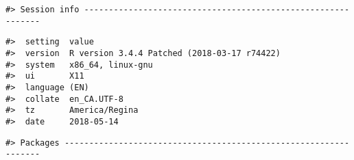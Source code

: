 \documentclass[12pt,]{article}
\begin{document}
\begin{verbatim}
#> Session info -------------------------------------------------------------
\end{verbatim}

\begin{verbatim}
#>  setting  value                                      
#>  version  R version 3.4.4 Patched (2018-03-17 r74422)
#>  system   x86_64, linux-gnu                          
#>  ui       X11                                        
#>  language (EN)                                       
#>  collate  en_CA.UTF-8                                
#>  tz       America/Regina                             
#>  date     2018-05-14
\end{verbatim}

\begin{verbatim}
#> Packages -----------------------------------------------------------------
\end{verbatim}
\end{document}
